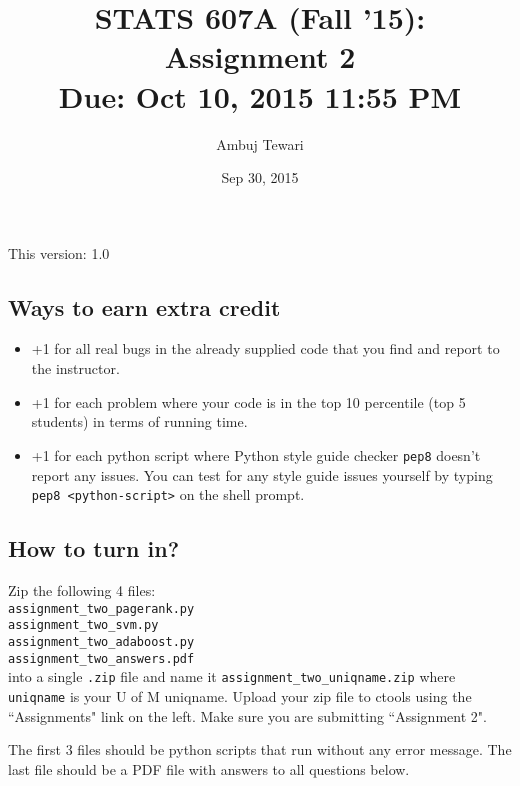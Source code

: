 \documentclass{article}
\begin{document}
\author{Ambuj Tewari}
\title{STATS 607A (Fall '15): Assignment 2\\
Due: Oct 10, 2015 11:55 PM}
\date{Sep 30, 2015}

\maketitle

\begin{center}
This version: 1.0
\end{center}

\subsection*{Ways to earn extra credit}

\begin{itemize}
\item +1 for all real bugs in the already supplied code that you find and report to the instructor.
\item +1 for each problem where your code is in the top 10 percentile (top 5 students) in terms of running time.
\item +1 for each python script where Python style guide checker {\tt pep8} doesn't report any issues. You can test for any style guide issues yourself by typing
{\tt pep8 <python-script>} on the shell prompt.

\end{itemize}

\subsection*{How to turn in?}

Zip the following 4 files:\\
{\tt assignment\_two\_pagerank.py} \\
{\tt assignment\_two\_svm.py} \\
{\tt assignment\_two\_adaboost.py} \\
{\tt assignment\_two\_answers.pdf} \\
into a single {\tt .zip} file and name it {\tt assignment\_two\_uniqname.zip} where {\tt uniqname} is your U of M uniqname. Upload your zip file to ctools using the ``Assignments" link on the left. Make sure
 you are submitting ``Assignment 2".

The first 3 files should be python scripts that run without any error message. The last file should be a PDF file with answers to all questions below. 
\end{document}
